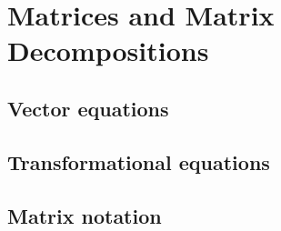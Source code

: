 
\chapter{Matrices and Matrix Decompositions}
\label{ch:decomps}

\section{}
\label{sec:sys}

\section{Vector equations}
\label{sec:vect}

\section{Transformational equations}
\label{sec:trans}

\section{Matrix notation}
\label{sec:mat}
